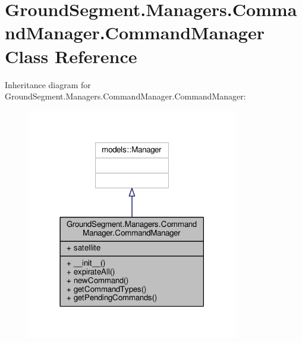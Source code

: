 \hypertarget{class_ground_segment_1_1_managers_1_1_command_manager_1_1_command_manager}{}\section{Ground\+Segment.\+Managers.\+Command\+Manager.\+Command\+Manager Class Reference}
\label{class_ground_segment_1_1_managers_1_1_command_manager_1_1_command_manager}


Inheritance diagram for Ground\+Segment.\+Managers.\+Command\+Manager.\+Command\+Manager\+:\nopagebreak
\begin{figure}[H]
\begin{center}
\leavevmode
\includegraphics[width=261pt]{class_ground_segment_1_1_managers_1_1_command_manager_1_1_command_manager__inherit__graph}
\end{center}
\end{figure}


